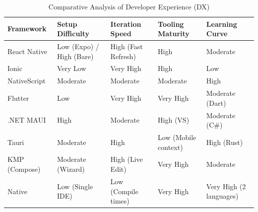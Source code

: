 \begin{table}[ht]
\centering
\caption{Comparative Analysis of Developer Experience (DX)}
\label{tab:dx_comparison}
\begin{tabularx}{\textwidth}{|l|X|X|X|X|}
\hline
\textbf{Framework} & \textbf{Setup Difficulty} & \textbf{Iteration Speed} & \textbf{Tooling Maturity} & \textbf{Learning Curve} \\ \hline %
React Native       & Low (Expo) / High (Bare)  & High (Fast Refresh)      & High                      & Moderate                \\ \hline
Ionic              & Very Low                  & Very High                & High                      & Low                     \\ \hline
NativeScript       & Moderate                  & Moderate                 & Moderate                  & High                    \\ \hline
Flutter            & Low                       & Very High                & Very High                 & Moderate (Dart)         \\ \hline
.NET MAUI          & High                      & Moderate                 & High (VS)                 & Moderate (C\#)          \\ \hline
Tauri              & Moderate                  & High                     & Low (Mobile context)      & High (Rust)             \\ \hline
KMP (Compose) & Moderate (Wizard) & High (Live Edit) & Very High       & Moderate       \\ \hline
Native             & Low (Single IDE)          & Low (Compile times)      & Very High                 & Very High (2 languages)     \\ \hline
\end{tabularx}
\end{table}